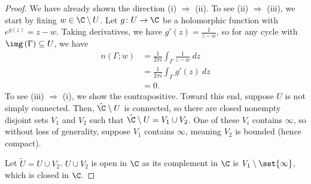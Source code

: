 \documentclass[10pt]{mypackage}
\begin{document}
\begin{proof}
  We have already shown the direction (i) $\Rightarrow$ (ii). To see (ii) $\Rightarrow$ (iii), we start by fixing $w\in \C\setminus U$. Let $g\colon U\rightarrow \C$ be a holomorphic function with $e^{g(z)} = z-w$. Taking derivatives, we have $g'(z) = \frac{1}{z-w}$, so for any cycle with $\img\left( \Gamma \right)\subseteq U$, we have
  \begin{align*}
    n\left( \Gamma;w \right) &= \frac{1}{2\pi i} \int_{\Gamma}^{} \frac{1}{z-w}\:dz\\
                             &= \frac{1}{2\pi i} \int_{\Gamma}^{} g'(z)\:dz\\
                             &= 0.
  \end{align*}
  To see (iii) $\Rightarrow$ (i), we show the contrapositive. Toward this end, suppose $U$ is not simply connected. Then, $\hat{\C}\setminus U$ is connected, so there are closed nonempty disjoint sets $V_1$ and $V_2$ such that $\hat{\C}\setminus U = V_1\cup V_2$. One of these $V_i$ contains $\infty$, so without loss of generality, suppose $V_1$ contains $\infty$, meaning $V_2$ is bounded (hence compact).\newline

  Let $\widetilde{U} = U\cup V_2$. $U\cup V_2$ is open in $\C$ as its complement in $\C$ is $V_1\setminus \set{\infty}$, which is closed in $\C$. 
\end{proof}
\end{document}
